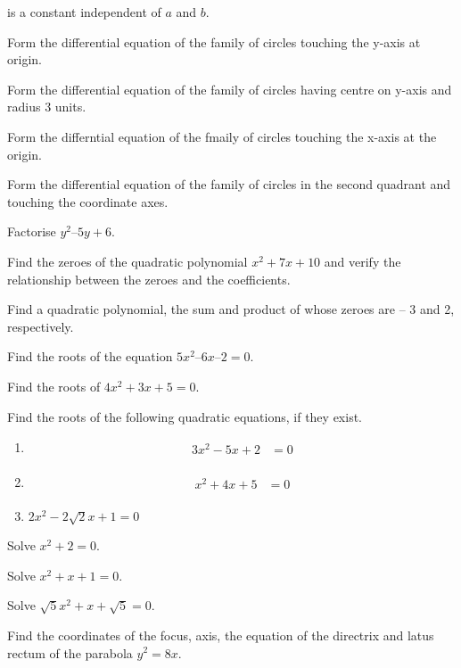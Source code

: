 %
is a constant independent of $a$ and $b$.
%
\item Form the differential equation of the family of circles touching the y-axis at origin.
\item Form the differential equation of the family of circles having centre on y-axis and radius 3 units.
\item Form the differntial equation of the fmaily of circles touching the x-axis at the origin.
%
\item Form the differential equation of the family of circles in the second quadrant and touching the coordinate axes.
\item Factorise $y^2 – 5y + 6$.
\item Find the zeroes of the quadratic polynomial $x^2+7x+10$ and verify the relationship between the zeroes and the coefficients.


\item Find a quadratic polynomial, the sum and product of whose zeroes are – 3 and 2, respectively.
%
\item Find the roots of the equation $5x^2  – 6x – 2 = 0 $.
\item Find the roots of $4x^2 + 3x + 5 = 0 $.
\item Find the roots of the following quadratic equations, if they exist.
\begin{enumerate}
    \item
    \begin{align}
    \begin{split}
    3x^2-5x+2&=0 \label{quad/2/23/1.0.1}
    \end{split}
    \end{align}
    \item
    \begin{align}
    \begin{split}
    x^2+4x+5&=0 \label{quad/2/23/1.0.2}
    \end{split}
    \end{align}
    \item 	$2x^2-2\sqrt{2}x+1 = 0$
\end{enumerate}
%
\solution
\begin{enumerate}

\end{enumerate}

\item Solve $x^2+ 2 = 0 $.
\item Solve $x^2+ x+1 = 0 $.
\item Solve $\sqrt{5}x^2+ x+\sqrt{5} = 0 $.
%
\item Find the coordinates of the focus, axis, the equation of the directrix and latus rectum of the parabola $y^2 = 8x$.
%

